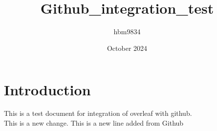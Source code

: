 \documentclass{article}
\title{Github_integration_test}
\author{hbm9834 }
\date{October 2024}
\begin{document}
\maketitle

\section{Introduction}
This is a test document for integration of overleaf with github.\\
This is a new change.
This is a new line added from Github\\
\end{document}
